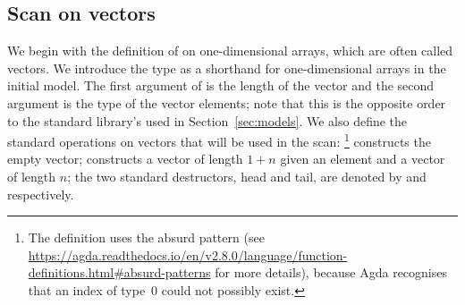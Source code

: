 \subsection{\label{sec:vect}Scan on vectors}
We begin with the definition of  on one-dimensional arrays, which are
often called vectors.  We introduce the  type as a shorthand for
one-dimensional arrays in the initial model.  The first argument of  is
the length of the vector and the second argument is the type of the vector
elements; note that this is the opposite order to the standard library's
 used in Section~\ref{sec:models}.  We also define the standard operations on vectors that will be used
in the scan: \footnote{The definition uses the absurd pattern (see
\url{https://agda.readthedocs.io/en/v2.8.0/language/function-definitions.html\#absurd-patterns}
for more details), because Agda recognises that an index of type \,0
could not possibly exist.} constructs the empty vector;  constructs a
vector of length $1+n$ given an element and a vector of length $n$; the two
standard destructors, head and tail, are denoted by  and 
respectively.
\begin{code}[hide]%
\>[0]\AgdaSpace{}%
\AgdaSpace{}%
\<%
\end{code}
